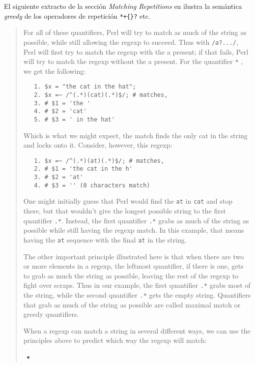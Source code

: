 El siguiente extracto de la sección {\it Matching Repetitions} en  
ilustra la semántica {\it greedy} de los operadores de repetición \verb|*+{}?| etc.
\begin{it}
\begin{quotation}
For all of these quantifiers, Perl will try to match as much of the string
as possible, while still allowing the regexp to succeed. Thus with \verb#/a?.../#, 
Perl will first try to match the regexp with the a present; if that
fails, Perl will try to match the regexp without the a  present. For
the quantifier \verb|*| , we get the following:

\begin{verbatim}
   1. $x = "the cat in the hat";
   2. $x =~ /^(.*)(cat)(.*)$/; # matches,
   3. # $1 = 'the '
   4. # $2 = 'cat'
   5. # $3 = ' in the hat'
\end{verbatim}

Which is what we might expect, the match finds the only cat in the string and locks onto it. Consider, however, this regexp:

\begin{verbatim}
   1. $x =~ /^(.*)(at)(.*)$/; # matches,
   2. # $1 = 'the cat in the h'
   3. # $2 = 'at'
   4. # $3 = '' (0 characters match)
\end{verbatim}

One might initially guess that Perl would find the \verb|at| in \verb|cat| and stop
there, but that wouldn't give the longest possible string to the first
quantifier \verb|.*|. Instead, the first quantifier \verb|.*| grabs as much of the
string as possible while still having the regexp match. In this example,
that means having the \verb|at| sequence with the final \verb|at| in the string. 

The
other important principle illustrated here is that when there are two
or more elements in a regexp, the leftmost quantifier, if there is one,
gets to grab as much the string as possible, leaving the rest of the
regexp to fight over scraps. Thus in our example, the first quantifier
\verb|.*| grabs most of the string, while the second quantifier \verb|.*| gets the
empty string. Quantifiers that grab as much of the string as possible
are called maximal match or greedy quantifiers.

When a regexp can match a string in several different ways, we can use
the principles above to predict which way the regexp will match:

\begin{itemize}
    \item


\end{itemize}
\end{quotation}
\end{it}
